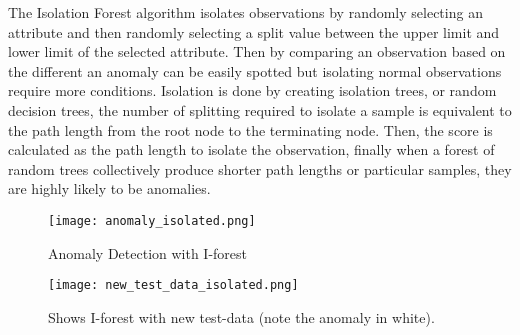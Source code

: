 \documentclass[a4paper, parskip=full]{scrartcl}
\begin{document}
The Isolation Forest algorithm isolates observations by randomly selecting an attribute and then randomly selecting a split value between the upper limit and lower limit of the selected attribute. Then by comparing an observation based on the different an anomaly can be easily spotted but isolating normal observations require more conditions. 
Isolation is done by creating isolation trees, or random decision trees, the number of splitting required to isolate a sample is equivalent to the path length from the root node to the terminating node. Then, the score is calculated as the path length to isolate the observation, finally when a forest of random trees collectively produce shorter path lengths or particular samples, they are highly likely to be anomalies.
 
\newpage 

\begin{figure}

		\centering
		\texttt{[image: anomaly\_isolated.png]}
		\caption{Anomaly Detection with I-forest }
	
\end{figure}

\begin{figure}
		\centering
		\texttt{[image: new\_test\_data\_isolated.png]}
		\caption{ Shows I-forest with new test-data (note the anomaly in white).}
	
\end{figure}

 	
\end{document}
